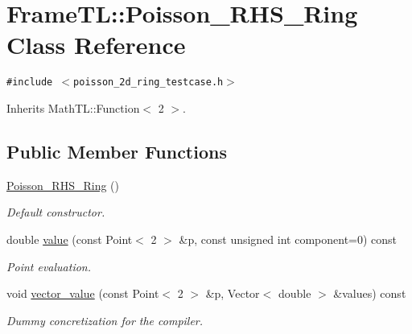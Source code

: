\hypertarget{classFrameTL_1_1Poisson__RHS__Ring}{
\section{FrameTL::Poisson\_\-RHS\_\-Ring Class Reference}
\label{classFrameTL_1_1Poisson__RHS__Ring}
}
{\tt \#include $<$poisson\_\-2d\_\-ring\_\-testcase.h$>$}

Inherits MathTL::Function$<$ 2 $>$.

\subsection*{Public Member Functions}
\begin{CompactItemize}
\item 
\hypertarget{classFrameTL_1_1Poisson__RHS__Ring_ec87045bea1e955b26fef5deb5f3e1cd}{
\hyperlink{classFrameTL_1_1Poisson__RHS__Ring_ec87045bea1e955b26fef5deb5f3e1cd}{Poisson\_\-RHS\_\-Ring} ()}
\label{classFrameTL_1_1Poisson__RHS__Ring_ec87045bea1e955b26fef5deb5f3e1cd}

\begin{CompactList}\small\item\em Default constructor. \item\end{CompactList}\item 
\hypertarget{classFrameTL_1_1Poisson__RHS__Ring_eb52be0ea13b42de24b00c46de0009eb}{
double \hyperlink{classFrameTL_1_1Poisson__RHS__Ring_eb52be0ea13b42de24b00c46de0009eb}{value} (const Point$<$ 2 $>$ \&p, const unsigned int component=0) const }
\label{classFrameTL_1_1Poisson__RHS__Ring_eb52be0ea13b42de24b00c46de0009eb}

\begin{CompactList}\small\item\em Point evaluation. \item\end{CompactList}\item 
\hypertarget{classFrameTL_1_1Poisson__RHS__Ring_b10dc4b7421c873161adc2f3c3505193}{
void \hyperlink{classFrameTL_1_1Poisson__RHS__Ring_b10dc4b7421c873161adc2f3c3505193}{vector\_\-value} (const Point$<$ 2 $>$ \&p, Vector$<$ double $>$ \&values) const }
\label{classFrameTL_1_1Poisson__RHS__Ring_b10dc4b7421c873161adc2f3c3505193}

\begin{CompactList}\small\item\em Dummy concretization for the compiler. \item\end{CompactList}\end{CompactItemize}


